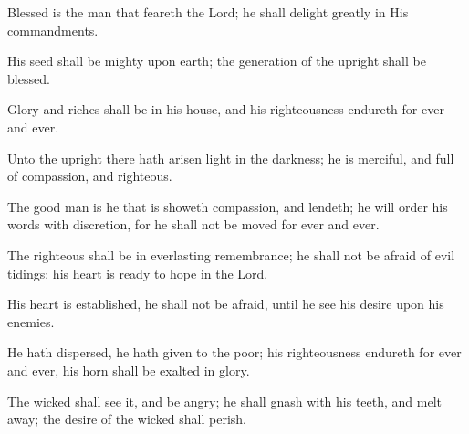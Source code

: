 Blessed is the man that feareth the Lord; he shall delight greatly in His commandments.

His seed shall be mighty upon earth; the generation of the upright shall be blessed.

Glory and riches shall be in his house, and his righteousness endureth for ever and ever.

Unto the upright there hath arisen light in the darkness; he is merciful, and full of compassion, and righteous.

The good man is he that is showeth compassion, and lendeth; he will order his words with discretion, for he shall not be moved for ever and ever.

The righteous shall be in everlasting remembrance; he shall not be afraid of evil tidings; his heart is ready to hope in the Lord.

His heart is established, he shall not be afraid, until he see his desire upon his enemies.

He hath dispersed, he hath given to the poor; his righteousness endureth for ever and ever, his horn shall be exalted in glory.

The wicked shall see it, and be angry; he shall gnash with his teeth, and melt away; the desire of the wicked shall perish.
